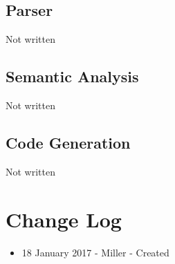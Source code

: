 \documentclass[english]{article}
\begin{document}
\subsection{Parser}

Not written

\subsection{Semantic Analysis}

Not written

\subsection{Code Generation}

Not written



\section{Change Log}

\begin{itemize}
\item
18 January 2017 - Miller - Created

\end{itemize}
\end{document}
